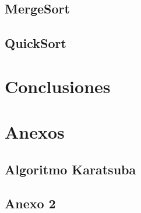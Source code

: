 \documentclass{report}
\begin{document}
    \section*{MergeSort}
        
        \newpage
    
    \section*{QuickSort}
        
        
\chapter*{Conclusiones}
    
    
\chapter*{Anexos}
    \section*{Algoritmo Karatsuba}
        
        
    \section*{Anexo 2}
        
    

\end{document}
